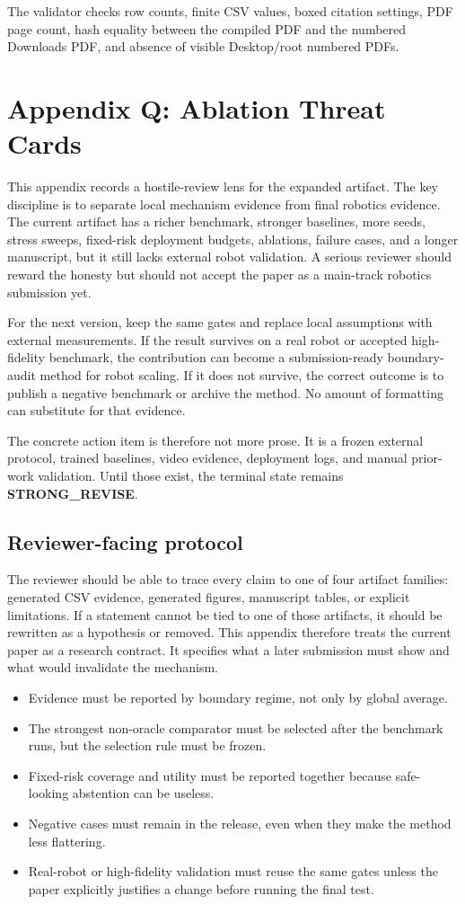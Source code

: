 \documentclass{article}
\begin{document}
The validator checks row counts, finite CSV values, boxed citation settings, PDF page count, hash equality between the compiled PDF and the numbered Downloads PDF, and absence of visible Desktop/root numbered PDFs.


\section{Appendix Q: Ablation Threat Cards}
This appendix records a hostile-review lens for the expanded artifact. The key discipline is to separate local mechanism evidence from final robotics evidence. The current artifact has a richer benchmark, stronger baselines, more seeds, stress sweeps, fixed-risk deployment budgets, ablations, failure cases, and a longer manuscript, but it still lacks external robot validation. A serious reviewer should reward the honesty but should not accept the paper as a main-track robotics submission yet.

For the next version, keep the same gates and replace local assumptions with external measurements. If the result survives on a real robot or accepted high-fidelity benchmark, the contribution can become a submission-ready boundary-audit method for robot scaling. If it does not survive, the correct outcome is to publish a negative benchmark or archive the method. No amount of formatting can substitute for that evidence.

The concrete action item is therefore not more prose. It is a frozen external protocol, trained baselines, video evidence, deployment logs, and manual prior-work validation. Until those exist, the terminal state remains \textbf{STRONG\_REVISE}.

\subsection{Reviewer-facing protocol}
The reviewer should be able to trace every claim to one of four artifact families: generated CSV evidence, generated figures, manuscript tables, or explicit limitations. If a statement cannot be tied to one of those artifacts, it should be rewritten as a hypothesis or removed. This appendix therefore treats the current paper as a research contract. It specifies what a later submission must show and what would invalidate the mechanism.

\begin{itemize}
\item Evidence must be reported by boundary regime, not only by global average.
\item The strongest non-oracle comparator must be selected after the benchmark runs, but the selection rule must be frozen.
\item Fixed-risk coverage and utility must be reported together because safe-looking abstention can be useless.
\item Negative cases must remain in the release, even when they make the method less flattering.
\item Real-robot or high-fidelity validation must reuse the same gates unless the paper explicitly justifies a change before running the final test.
\end{itemize}
\end{document}
